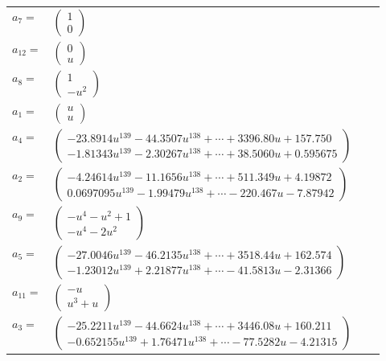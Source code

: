 \documentclass[1p]{elsarticle_modified}
\theoremstyle{definition}
\begin{document}
\begin{tabular}{m{7pt} m{180pt} m{7pt} m{180pt} }
\flushright $a_{7}=$&$\begin{pmatrix}1\\0\end{pmatrix}$ \\
\flushright $a_{12}=$&$\begin{pmatrix}0\\u\end{pmatrix}$ \\
\flushright $a_{8}=$&$\begin{pmatrix}1\\- u^2\end{pmatrix}$ \\
\flushright $a_{1}=$&$\begin{pmatrix}u\\u\end{pmatrix}$ \\
\flushright $a_{4}=$&$\begin{pmatrix}-23.8914 u^{139}-44.3507 u^{138}+\cdots+3396.80 u+157.750\\-1.81343 u^{139}-2.30267 u^{138}+\cdots+38.5060 u+0.595675\end{pmatrix}$ \\
\flushright $a_{2}=$&$\begin{pmatrix}-4.24614 u^{139}-11.1656 u^{138}+\cdots+511.349 u+4.19872\\0.0697095 u^{139}-1.99479 u^{138}+\cdots-220.467 u-7.87942\end{pmatrix}$ \\
\flushright $a_{9}=$&$\begin{pmatrix}- u^4- u^2+1\\- u^4-2 u^2\end{pmatrix}$ \\
\flushright $a_{5}=$&$\begin{pmatrix}-27.0046 u^{139}-46.2135 u^{138}+\cdots+3518.44 u+162.574\\-1.23012 u^{139}+2.21877 u^{138}+\cdots-41.5813 u-2.31366\end{pmatrix}$ \\
\flushright $a_{11}=$&$\begin{pmatrix}- u\\u^3+u\end{pmatrix}$ \\
\flushright $a_{3}=$&$\begin{pmatrix}-25.2211 u^{139}-44.6624 u^{138}+\cdots+3446.08 u+160.211\\-0.652155 u^{139}+1.76471 u^{138}+\cdots-77.5282 u-4.21315\end{pmatrix}$ \\

\end{tabular}
\end{document}
